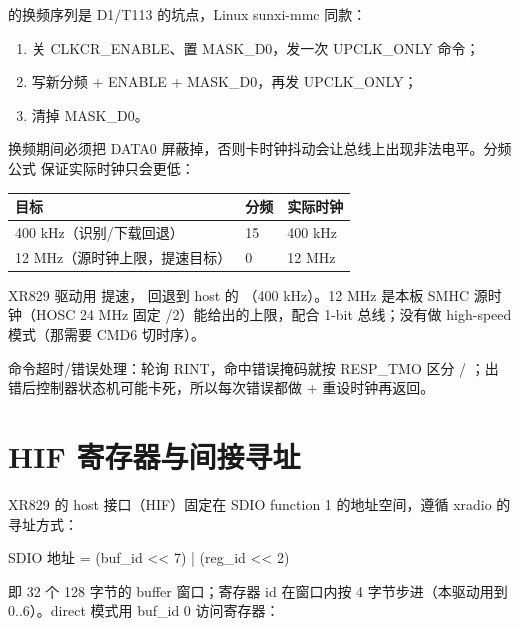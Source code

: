  的换频序列是 D1/T113 的坑点，Linux sunxi-mmc 同款：

\begin{enumerate}
  \item 关 CLKCR\_ENABLE、置 MASK\_D0，发一次 UPCLK\_ONLY 命令；
  \item 写新分频 + ENABLE + MASK\_D0，再发 UPCLK\_ONLY；
  \item 清掉 MASK\_D0。
\end{enumerate}

换频期间必须把 DATA0 屏蔽掉，否则卡时钟抖动会让总线上出现非法电平。分频公式  保证实际时钟只会更低：

\begin{table}[H]
\centering
\begin{tabular}{lll}
\toprule
目标 & 分频 & 实际时钟 \\
\midrule
400 kHz（识别/下载回退） & 15 & 400 kHz \\
12 MHz（源时钟上限，提速目标） & 0 & 12 MHz \\
\bottomrule
\end{tabular}
\end{table}

XR829 驱动用  提速， 回退到 host 的 （400 kHz）。12 MHz 是本板 SMHC 源时钟（HOSC 24 MHz 固定 /2）能给出的上限，配合 1-bit 总线；没有做 high-speed 模式（那需要 CMD6 切时序）。

命令超时/错误处理：轮询 RINT，命中错误掩码就按 RESP\_TMO 区分  / ；出错后控制器状态机可能卡死，所以每次错误都做  + 重设时钟再返回。

\section{HIF 寄存器与间接寻址}

XR829 的 host 接口（HIF）固定在 SDIO function 1 的地址空间，遵循 xradio  的寻址方式：

\begin{txtcode}
SDIO 地址 = (buf_id << 7) | (reg_id << 2)
\end{txtcode}

即 32 个 128 字节的 buffer 窗口；寄存器 id 在窗口内按 4 字节步进（本驱动用到 0..6）。direct 模式用 buf\_id 0 访问寄存器：


